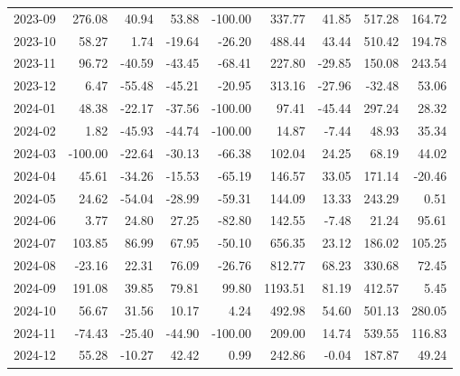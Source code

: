 \begin{table}[ht]
\begin{tabular}{lrrrrrrrr}
  2023-09 & 276.08 & 40.94 & 53.88 & -100.00 & 337.77 & 41.85 & 517.28 & 164.72 \\ 
  2023-10 & 58.27 & 1.74 & -19.64 & -26.20 & 488.44 & 43.44 & 510.42 & 194.78 \\ 
  2023-11 & 96.72 & -40.59 & -43.45 & -68.41 & 227.80 & -29.85 & 150.08 & 243.54 \\ 
  2023-12 & 6.47 & -55.48 & -45.21 & -20.95 & 313.16 & -27.96 & -32.48 & 53.06 \\ 
  2024-01 & 48.38 & -22.17 & -37.56 & -100.00 & 97.41 & -45.44 & 297.24 & 28.32 \\ 
  2024-02 & 1.82 & -45.93 & -44.74 & -100.00 & 14.87 & -7.44 & 48.93 & 35.34 \\ 
  2024-03 & -100.00 & -22.64 & -30.13 & -66.38 & 102.04 & 24.25 & 68.19 & 44.02 \\ 
  2024-04 & 45.61 & -34.26 & -15.53 & -65.19 & 146.57 & 33.05 & 171.14 & -20.46 \\ 
  2024-05 & 24.62 & -54.04 & -28.99 & -59.31 & 144.09 & 13.33 & 243.29 & 0.51 \\ 
  2024-06 & 3.77 & 24.80 & 27.25 & -82.80 & 142.55 & -7.48 & 21.24 & 95.61 \\ 
  2024-07 & 103.85 & 86.99 & 67.95 & -50.10 & 656.35 & 23.12 & 186.02 & 105.25 \\ 
  2024-08 & -23.16 & 22.31 & 76.09 & -26.76 & 812.77 & 68.23 & 330.68 & 72.45 \\ 
  2024-09 & 191.08 & 39.85 & 79.81 & 99.80 & 1193.51 & 81.19 & 412.57 & 5.45 \\ 
  2024-10 & 56.67 & 31.56 & 10.17 & 4.24 & 492.98 & 54.60 & 501.13 & 280.05 \\ 
  2024-11 & -74.43 & -25.40 & -44.90 & -100.00 & 209.00 & 14.74 & 539.55 & 116.83 \\ 
  2024-12 & 55.28 & -10.27 & 42.42 & 0.99 & 242.86 & -0.04 & 187.87 & 49.24 \\ 
   \hline
\end{tabular}
\end{table}
